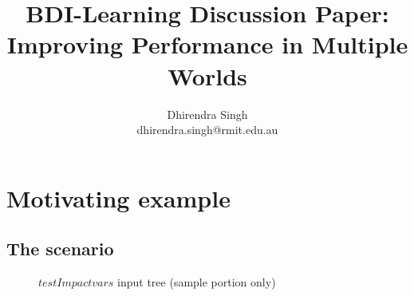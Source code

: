 \documentclass[a4paper]{article}
\title{BDI-Learning Discussion Paper:\\Improving Performance in Multiple Worlds}
\author{
Dhirendra Singh\\ 
dhirendra.singh@rmit.edu.au\\
}
\begin{document}

\maketitle

\setcounter{tocdepth}{2} 
\tableofcontents 

\section{Motivating example}

\subsection{The scenario}
\begin{figure}[htbp]
   \centering
{}
   \caption{$testImpactvars$ input tree (sample portion only)}
   \label{fig:testImpactvarsTree}
\end{figure}
\end{document}
